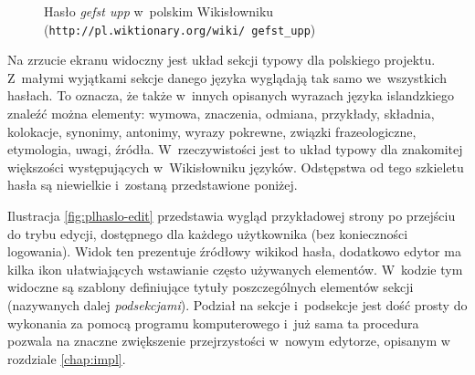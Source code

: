 \documentclass{pracamgr}
\newenvironment{illustration}[0]{
	\begin{figure}[ht]
	\begin{center}
}{
	\end{center}
	\end{figure}
}
\begin{document}
\begin{illustration}
	\caption{Hasło \emph{gefst upp} w~polskim Wikisłowniku (\texttt{http://pl.wiktionary.org/wiki/ gefst\_upp})}
	\label{fig:plhaslo}
\end{illustration}

Na zrzucie ekranu widoczny jest układ sekcji typowy dla polskiego projektu. Z~małymi wyjątkami sekcje danego języka wyglądają tak samo we~wszystkich hasłach. To oznacza, że także w~innych opisanych wyrazach języka islandzkiego znaleźć można elementy: wymowa, znaczenia, odmiana, przykłady, składnia, kolokacje, synonimy, antonimy, wyrazy pokrewne, związki frazeologiczne, etymologia, uwagi, źródła. W~rzeczywistości jest to układ typowy dla znakomitej większości występujących w~Wikisłowniku języków. Odstępstwa od tego szkieletu hasła są niewielkie i~zostaną przedstawione poniżej.

Ilustracja \ref{fig:plhaslo-edit} przedstawia wygląd przykładowej strony po przejściu do trybu edycji, dostępnego dla każdego użytkownika (bez konieczności logowania). Widok ten prezentuje źródłowy wikikod hasła, dodatkowo edytor ma kilka ikon ułatwiających wstawianie często używanych elementów. W~kodzie tym widoczne są szablony definiujące tytuły poszczególnych elementów sekcji (nazywanych dalej \emph{podsekcjami}). Podział na sekcje i~podsekcje jest dość prosty do wykonania za pomocą programu komputerowego i~już sama ta procedura pozwala na znaczne zwiększenie przejrzystości w~nowym edytorze, opisanym w rozdziale \ref{chap:impl}.
\end{document}
